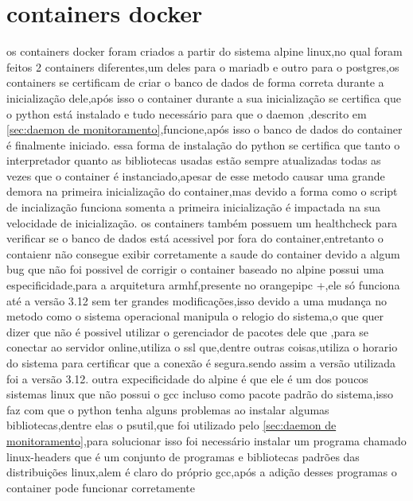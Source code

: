 \documentclass[
	12pt,				%
	openright,			%
	oneside,			%
	a4paper,			%
	english,			%
	french,				%
	spanish,			%
	brazil,				%
	]{abntex2}
\begin{document}
\section{containers docker}
\label{sec:containers docker}
os containers docker foram criados a partir do sistema alpine linux,no qual foram feitos 2 containers diferentes,um deles para o mariadb e outro para o postgres,os containers se certificam de criar o banco de dados de forma correta durante a inicialização dele,após isso o container durante a sua inicialização se certifica que o python está instalado e tudo necessário para que o daemon ,descrito em \autoref{sec:daemon de monitoramento},funcione,após isso o banco de dados do container é finalmente iniciado.
essa forma de instalação do python se certifica que tanto o interpretador quanto as bibliotecas usadas estão sempre atualizadas todas as vezes que o container é instanciado,apesar de esse metodo causar uma grande demora na primeira inicialização do container,mas devido a forma como o script de incialização funciona somenta a primeira inicialização é impactada na sua velocidade de inicialização.
os containers também possuem um healthcheck para verificar se o banco de dados está acessivel por fora do container,entretanto o contaienr não consegue exibir corretamente a saude do container devido a algum bug que não foi possivel de corrigir
o container baseado no alpine possui uma especificidade,para a arquitetura armhf,presente no orangepipc +,ele só funciona até a versão 3.12 sem ter grandes modificações,isso devido a uma mudança no metodo como o sistema operacional manipula o relogio do sistema,o que quer dizer que não é possivel utilizar o gerenciador de pacotes dele que ,para se conectar ao servidor online,utiliza o ssl que,dentre outras coisas,utiliza o horario do sistema para certificar que a conexão é segura.sendo assim a versão utilizada foi a versão 3.12.
outra expecificidade do alpine é que ele é um dos poucos sistemas linux que não possui o gcc incluso como pacote padrão do sistema,isso faz com que o python tenha alguns problemas ao instalar algumas bibliotecas,dentre elas o psutil,que foi utilizado pelo \autoref{sec:daemon de monitoramento},para solucionar isso foi necessário instalar um programa chamado linux-headers que é um conjunto de programas e bibliotecas padrões das distribuições linux,alem é claro do próprio gcc,após a adição desses programas o container pode funcionar corretamente
\end{document}
